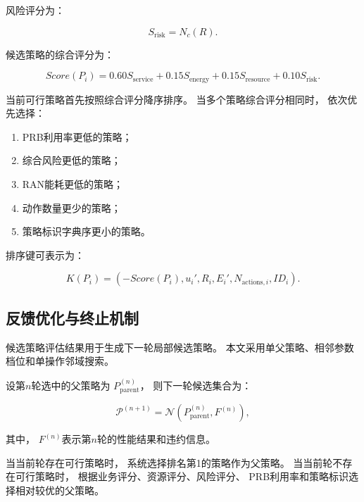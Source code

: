 \documentclass[lang=cn,12pt]{elegantbook}
\begin{document}
风险评分为：

\begin{equation}
S_{\mathrm{risk}}
=
N_c(R).
\label{eq:risk_score_reduced}
\end{equation}

候选策略的综合评分为：

\begin{equation}
Score(P_i)
=
0.60S_{\mathrm{service}}
+
0.15S_{\mathrm{energy}}
+
0.15S_{\mathrm{resource}}
+
0.10S_{\mathrm{risk}}.
\label{eq:total_score_reduced}
\end{equation}

当前可行策略首先按照综合评分降序排序。
当多个策略综合评分相同时，
依次优先选择：

\begin{enumerate}[label=\arabic*)]
    \item PRB利用率更低的策略；
    \item 综合风险更低的策略；
    \item RAN能耗更低的策略；
    \item 动作数量更少的策略；
    \item 策略标识字典序更小的策略。
\end{enumerate}

排序键可表示为：

\begin{equation}
K(P_i)
=
\left(
-Score(P_i),
u_i',
R_i,
E_i',
N_{\mathrm{actions},i},
ID_i
\right).
\label{eq:ranking_key_reduced}
\end{equation}


\subsection*{反馈优化与终止机制}

候选策略评估结果用于生成下一轮局部候选策略。
本文采用单父策略、相邻参数档位和单操作邻域搜索。

设第$n$轮选中的父策略为
$P_{\mathrm{parent}}^{(n)}$，
则下一轮候选集合为：

\begin{equation}
\mathcal{P}^{(n+1)}
=
\mathcal{N}
\left(
P_{\mathrm{parent}}^{(n)},
F^{(n)}
\right),
\label{eq:feedback_neighborhood_reduced}
\end{equation}

其中，
$F^{(n)}$表示第$n$轮的性能结果和违约信息。

当当前轮存在可行策略时，
系统选择排名第1的策略作为父策略。
当当前轮不存在可行策略时，
根据业务评分、资源评分、风险评分、
PRB利用率和策略标识选择相对较优的父策略。
\end{document}

